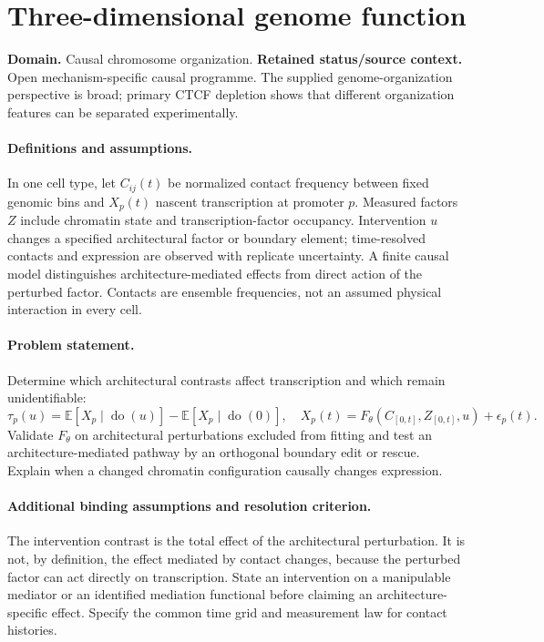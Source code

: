 \documentclass[11pt]{article}
\begin{document}
\section*{Three-dimensional genome function}
\label{prob:032}
\label{rank:21}
\par\smallskip

\noindent\textbf{Domain.} Causal chromosome organization. \quad \textbf{Retained status/source context.} Open mechanism-specific causal programme. The supplied genome-organization perspective is broad; primary CTCF depletion shows that different organization features can be separated experimentally.
\paragraph{Definitions and assumptions.} In one cell type, let $C_{ij}(t)$ be normalized contact frequency between fixed genomic bins and $X_p(t)$ nascent transcription at promoter $p$. Measured factors $Z$ include chromatin state and transcription-factor occupancy. Intervention $u$ changes a specified architectural factor or boundary element; time-resolved contacts and expression are observed with replicate uncertainty. A finite causal model distinguishes architecture-mediated effects from direct action of the perturbed factor. Contacts are ensemble frequencies, not an assumed physical interaction in every cell.
\paragraph{Problem statement.} Determine which architectural contrasts affect transcription and which remain unidentifiable:
\[
\tau_{p}(u)=\mathbb{E}[X_p\mid\operatorname{do}(u)]-\mathbb{E}[X_p\mid\operatorname{do}(0)],
\quad X_p(t)=F_\theta(C_{[0,t]},Z_{[0,t]},u)+\epsilon_p(t).
\]
Validate $F_\theta$ on architectural perturbations excluded from fitting and test an architecture-mediated pathway by an orthogonal boundary edit or rescue. Explain when a changed chromatin configuration causally changes expression.
\paragraph{Additional binding assumptions and resolution criterion.} The intervention contrast is the total effect of the architectural perturbation. It is not, by definition, the effect mediated by contact changes, because the perturbed factor can act directly on transcription. State an intervention on a manipulable mediator or an identified mediation functional before claiming an architecture-specific effect. Specify the common time grid and measurement law for contact histories.
\end{document}
